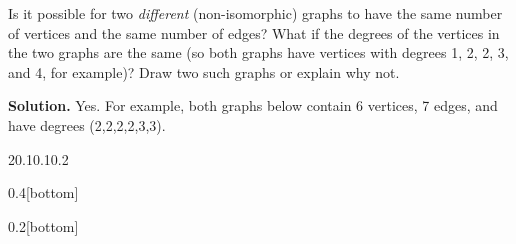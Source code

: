\documentclass{book}
\begin{document}
\setcounter{project}{9}
\addtocounter{project}{-1}
\begin{activity}[]\label{activity-5}
\hypertarget{p-79}{}%
Is it possible for two \emph{different} (non-isomorphic) graphs to have the same number of vertices and the same number of edges? What if the degrees of the vertices in the two graphs are the same (so both graphs have vertices with degrees 1, 2, 2, 3, and 4, for example)? Draw two such graphs or explain why not.%
\par\smallskip%
\noindent\textbf{Solution.}\hypertarget{solution-7}{}\quad%
\hypertarget{p-80}{}%
Yes. For example, both graphs below contain 6 vertices, 7 edges, and have degrees (2,2,2,2,3,3).%
\begin{sidebyside}{2}{0.1}{0.1}{0.2}
\begin{sbspanel}{0.4}[bottom]
\end{sbspanel}
\begin{sbspanel}{0.2}[bottom]
\end{sbspanel}
\end{sidebyside}
\end{activity}

\clearpage
\end{document}
